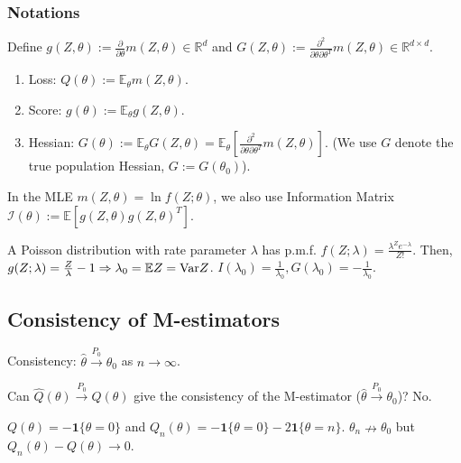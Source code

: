 \documentclass[11pt]{elegantbook}
\begin{document}
\subsubsection*{Notations}
Define $g(Z,\theta):=\frac{\partial}{\partial \theta}m(Z,\theta)\in \mathbb{R}^d$ and $G(Z,\theta):=\frac{\partial^2}{\partial \theta\partial \theta^T}m(Z,\theta)\in \mathbb{R}^{d\times d}$.
\begin{definition}
\normalfont
\begin{enumerate}
    \item Loss: $Q(\theta):=\mathbb{E}_{\theta}m(Z,\theta)$.
    \item Score: $g(\theta):=\mathbb{E}_{\theta}g(Z,\theta)$.
    \item Hessian: $G(\theta):=\mathbb{E}_{\theta}G(Z,\theta)= \mathbb{E}_\theta\left[\frac{\partial^2}{\partial \theta\partial \theta^T}m(Z,\theta)\right]$. (We use $G$ denote the true population Hessian, $G:=G(\theta_0)$).
\end{enumerate}
\end{definition}
In the MLE $m(Z,\theta)=\ln f(Z;\theta)$, we also use Information Matrix $\mathcal{I}(\theta):=\mathbb{E}[g(Z,\theta)g(Z,\theta)^T]$.
\begin{example}
    A Poisson distribution with rate parameter $\lambda$ has p.m.f. $f(Z;\lambda)=\frac{\lambda^Z e^{-\lambda}}{Z!}$. Then, $g(Z;\lambda)=\frac{Z}{\lambda}-1 \Rightarrow \lambda_0=\mathbb{E}Z=\textnormal{Var}Z$. $I(\lambda_0)=\frac{1}{\lambda_0}, G(\lambda_0)=-\frac{1}{\lambda_0}$.
\end{example}



\subsection{Consistency of M-estimators}
Consistency: $\hat{\theta} \stackrel{P_0}{\longrightarrow} \theta_0$ as $n \rightarrow \infty$.

Can $\hat{Q}(\theta)\stackrel{P_0}{\longrightarrow} Q(\theta)$ give the consistency of the M-estimator ($\hat{\theta} \stackrel{P_0}{\longrightarrow} \theta_0$)? No.
\begin{example}
    $Q(\theta)=-\mathbf{1}\{\theta=0\}$ and $Q_n(\theta)=-\mathbf{1}\{\theta=0\}-2\mathbf{1}\{\theta=n\}$. $\theta_n \nrightarrow \theta_0$ but $Q_n(\theta)-Q(\theta) \rightarrow 0$.
\end{example}
\end{document}
